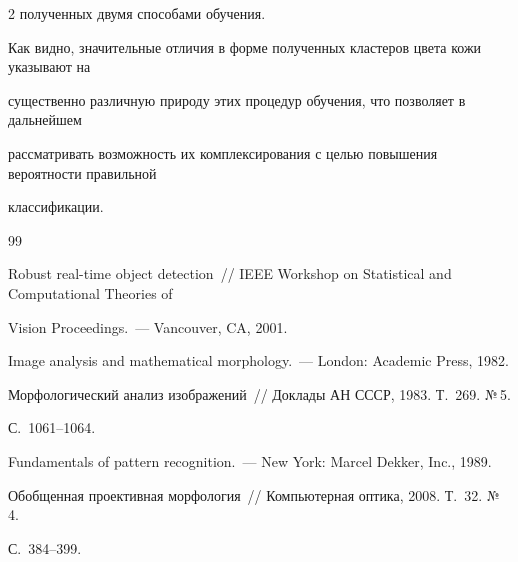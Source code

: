 \begin{multicols}{2}
полученных двумя способами обучения.





Как видно, значительные отличия в форме полученных кластеров цвета кожи указывают на 

существенно различную природу этих процедур обуче\-ния, что позволяет в дальнейшем 

рассматривать возможность их комплексирования с целью повышения вероятности правильной 

классификации.



{\small\frenchspacing

{%


\begin{thebibliography}{99}





Robust real-time object detection~//  IEEE Workshop on Statistical and Computational Theories of 

Vision Proceedings.~--- Vancouver, CA,  2001.







Image analysis and mathematical morphology.~--- London: Academic Press, 1982. 





Морфологический анализ изображений~// Доклады АН СССР, 1983. Т.~269. №\,5. 

С.~1061--1064.





Fundamentals of pattern recognition.~--- New York: Marcel Dekker, Inc., 1989.





Обобщенная проективная морфология~// Компьютерная оптика, 2008. Т.~32. №\,4. 

С.~384--399.




\end{thebibliography}}}
\end{multicols}
